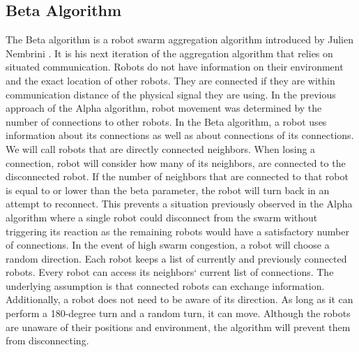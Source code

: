\subsection{Beta Algorithm}
The Beta algorithm is a robot swarm aggregation algorithm introduced by Julien Nembrini \cite{Nembrini2002}. It is his next iteration of the aggregation algorithm that relies on situated communication. Robots do not have information on their environment and the exact location of other robots. They are connected if they are within communication distance of the physical signal they are using. In the previous approach of the Alpha algorithm, robot movement was determined by the number of connections to other robots. In the Beta algorithm, a robot uses information about its connections as well as about connections of its connections. We will call robots that are directly connected neighbors. When losing a connection, robot will consider how many of its neighbors, are connected to the disconnected robot. If the number of neighbors that are connected to that robot is equal to or lower than the beta parameter, the robot will turn back in an attempt to reconnect. This prevents a situation previously observed in the Alpha algorithm where a single robot could disconnect from the swarm without triggering its reaction as the remaining robots would have a satisfactory number of connections. In the event of high swarm congestion, a robot will choose a random direction. Each robot keeps a list of currently and previously connected robots. Every robot can access its neighbors` current list of connections. The underlying assumption is that connected robots can exchange information. Additionally, a robot does not need to be aware of its direction. As long as it can perform a 180-degree turn and a random turn, it can move. Although the robots are unaware of their positions and environment, the algorithm will prevent them from disconnecting.

